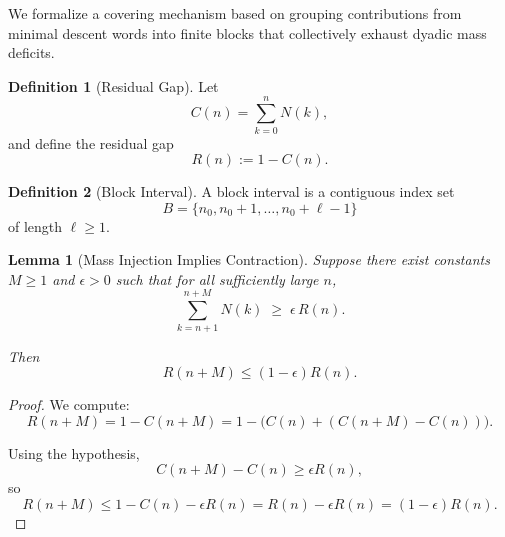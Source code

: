 \documentclass[12pt, oneside]{article}
\numberwithin{equation}{section}
\theoremstyle{definition}
\newtheorem{definition}{Definition}[section]
\theoremstyle{plain}
\newtheorem{lemma}[theorem]{Lemma}
\theoremstyle{remark}
\begin{document}
We formalize a covering mechanism based on grouping contributions
from minimal descent words into finite blocks that collectively
exhaust dyadic mass deficits.

\begin{definition}[Residual Gap]
Let
\[
C(n) = \sum_{k=0}^n N(k),
\]
and define the residual gap
\[
R(n) := 1 - C(n).
\]
\end{definition}




\begin{definition}[Block Interval]
A block interval is a contiguous index set
\[
B = \{n_0, n_0+1, \dots, n_0+\ell-1\}
\]
of length $\ell \ge 1$.
\end{definition}




\begin{lemma}[Mass Injection Implies Contraction]
\label{lem:mass-injection}
Suppose there exist constants $M \ge 1$ and $\epsilon > 0$ such that
for all sufficiently large $n$,
\[
\sum_{k=n+1}^{n+M} N(k) \;\ge\; \epsilon \, R(n).
\]

Then
\[
R(n+M) \le (1-\epsilon) R(n).
\]
\end{lemma}

\begin{proof}
We compute:
\[
R(n+M)
=
1 - C(n+M)
=
1 - \bigl(C(n) + (C(n+M)-C(n))\bigr).
\]

Using the hypothesis,
\[
C(n+M)-C(n) \ge \epsilon R(n),
\]
so
\[
R(n+M)
\le
1 - C(n) - \epsilon R(n)
=
R(n) - \epsilon R(n)
=
(1-\epsilon) R(n).
\]
\end{proof}
\end{document}
